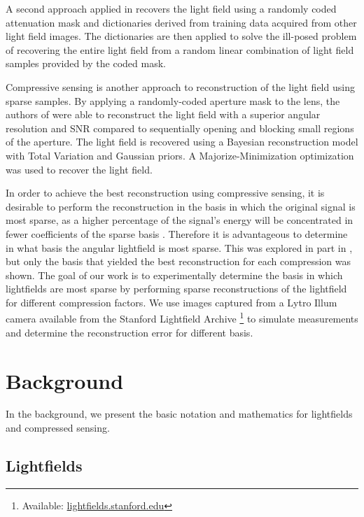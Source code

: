 \documentclass[10pt,twocolumn,letterpaper]{article}
\begin{document}
A second approach applied in \cite{LFDict} recovers the light field using a randomly coded attenuation mask and dictionaries derived from training data acquired from other light field images. The dictionaries are then applied to solve the ill-posed problem of recovering the entire light field from a random linear combination of light field samples provided by the coded mask.

Compressive sensing \cite{IntroCS}\cite{CompressiveSensingMega} is another approach to reconstruction of the light field using sparse samples. By applying a randomly-coded aperture mask to the lens, the authors of \cite{SparsityInCFD} were able to reconstruct the light field with a superior angular resolution and SNR compared to sequentially opening and blocking small regions of the aperture. The light field is recovered using a Bayesian reconstruction model with Total Variation and Gaussian priors. A Majorize-Minimization optimization was used to recover the light field.

In order to achieve the best reconstruction using compressive sensing, it is desirable to perform the reconstruction in the basis in which the original signal is most sparse, as a higher percentage of the signal's energy will be concentrated in fewer coefficients of the sparse basis \cite{CompressiveSensingMega}. Therefore it is advantageous to determine in what basis the angular lightfield is most sparse. This was explored in part in \cite{mainP1}, but only the basis that yielded the best reconstruction for each compression was shown. The goal of our work is to experimentally determine the basis in which lightfields are most sparse by performing sparse reconstructions of the lightfield for different compression factors. We use images captured from a Lytro Illum camera available from the Stanford Lightfield Archive \footnote{Available: \url{lightfields.stanford.edu}} to simulate measurements and determine the reconstruction error for different basis.

\section{Background}

In the background, we present the basic notation and mathematics for lightfields and compressed sensing.

\subsection{Lightfields}
\end{document}
